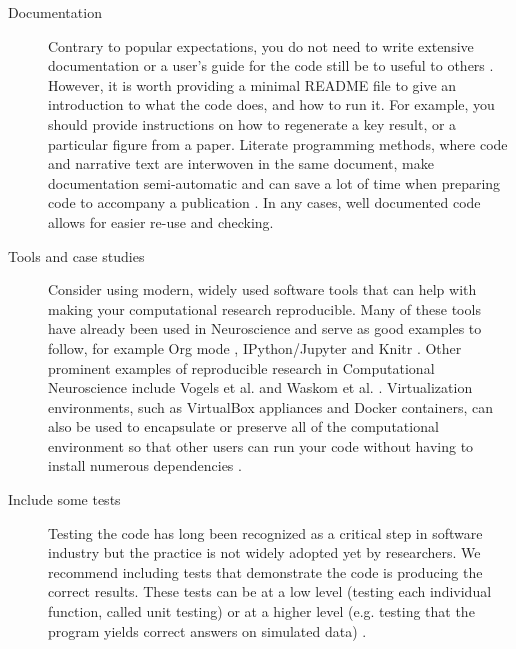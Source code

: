 \documentclass[11pt]{article}
\begin{document}
\begin{description}
\item [Documentation] Contrary to popular expectations, you do not
  need to write extensive documentation or a user's guide for the code
  still be to useful to others \cite{Barnes2010-iv}.  However, it is
  worth providing a minimal README file to give an introduction to
  what the code does, and how to run it.  For example, you should provide
  instructions on how to regenerate a key result, or a particular
  figure from a paper. Literate programming methods, where code and narrative text are interwoven in the same document, make documentation semi-automatic and can save a lot of time when preparing code to accompany a publication \cite{schulte2012multi, gentleman2012statistical}. In any cases, well documented code allows for easier re-use and checking.

\item [Tools and case studies] Consider using modern, widely used software tools that can help with making your computational research reproducible.  Many of
  these tools have already been used in Neuroscience and serve as good
  examples to follow, for example Org mode \cite{Delescluse2011},
  IPython/Jupyter \cite{Stevens2013} and Knitr \cite{Eglen2014}.  Other
  prominent examples of reproducible research in Computational
  Neuroscience include Vogels et al. \cite{Vogels2011-c8c} and Waskom et al. \cite{Waskom2014-gd}.
  Virtualization environments, such as VirtualBox appliances and
  Docker containers, can also be used to
  encapsulate or preserve all of the computational environment so that
  other users can run your code without having to install numerous dependencies \cite{Boettiger2015}.

\item [Include some tests] Testing the code has long been recognized
  as a critical step in software industry but the practice is not
  widely adopted yet by researchers. We recommend including tests that
  demonstrate the code is producing the correct
  results\cite{Axelrod2014-xi}. These tests can be at a low level
  (testing each individual function, called unit testing) or at a
  higher level (e.g. testing that the program yields correct answers
  on simulated data) \cite{wilson_best_2014}.

\end{description}
\end{document}
